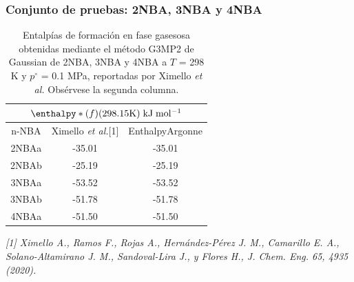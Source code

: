 \documentclass{beamer}
\begin{document}
\begin{frame}
\frametitle{Conjunto de pruebas: 2NBA, 3NBA y 4NBA}
\begin{table}[H]
\centering
\begin{tabular}{|c|c|c|}
\hline
	\multicolumn{3}{||c||}{$\enthalpy*(f){}(298.15 \mathrm{K})\; \mathrm{kJ\;mol^{-1}}$}\\
\hline
\hline
	n-NBA & Ximello \textit{et al.}[1] & EnthalpyArgonne\\ 
\hline
2NBAa & -35.01 & -35.01\\
\hline
2NBAb & -25.19 & -25.19\\ 
\hline 
3NBAa & -53.52 & -53.52\\
\hline
3NBAb & -51.78 & -51.78\\ 
\hline
4NBAa & -51.50 & -51.50\\ 
\hline  
\end{tabular} 
	\caption{Entalpías de formación en fase gasesosa obtenidas mediante el método G3MP2 de Gaussian de 2NBA, 3NBA y 4NBA a $T$ = 298 K y $p^{\circ}$ = 0.1 MPa, reportadas por Ximello \textit{et al.} Obsérvese la segunda columna.}
\label{Ximello-table-3}
\end{table}
\textit{\tiny{[1] Ximello A., Ramos F., Rojas A., Hernández-Pérez J. M., Camarillo E. A., Solano-Altamirano J. M., Sandoval-Lira J., y Flores H., J. Chem. Eng. 65, 4935 (2020).}}
\end{frame}

\end{document}
